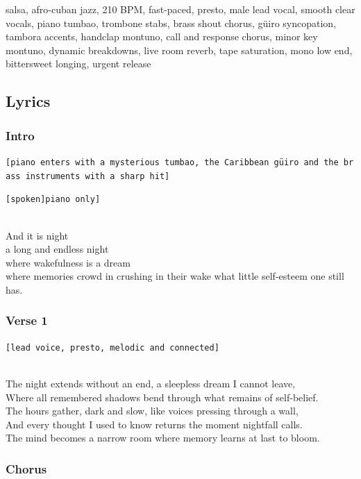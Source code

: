 \documentclass[]{article}
\begin{document}
salsa, afro-cuban jazz, 210 BPM, fast-paced, presto, male lead vocal,
smooth clear vocals, piano tumbao, trombone stabs, brass shout chorus,
güiro syncopation, tambora accents, handclap montuno, call and response
chorus, minor key montuno, dynamic breakdowns, live room reverb, tape
saturation, mono low end, bittersweet longing, urgent release

\subsection{Lyrics}\label{lyrics-31}

\subsubsection{Intro}\label{intro-12}

\texttt{{[}piano\ enters\ with\ a\ mysterious\ tumbao,\ the\ Caribbean\ güiro\ and\ the\ brass\ instruments\ with\ a\ sharp\ hit{]}}

\texttt{{[}spoken{]}\textasciigrave{}\textasciigrave{}{[}piano\ only{]}}\strut \\
And it is night\\
a long and endless night\\
where wakefulness is a dream\\
where memories crowd in crushing in their wake what little self-esteem
one still has.

\subsubsection{Verse 1}\label{verse-1-22}

\texttt{{[}lead\ voice,\ presto,\ melodic\ and\ connected{]}}\strut \\
The night extends without an end, a sleepless dream I cannot leave,\\
Where all remembered shadows bend through what remains of self-belief.\\
The hours gather, dark and slow, like voices pressing through a wall,\\
And every thought I used to know returns the moment nightfall calls.\\
The mind becomes a narrow room where memory learns at last to bloom.

\subsubsection{Chorus}\label{chorus-59}
\end{document}

